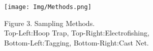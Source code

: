 \documentclass[kappa, margin=1cm, fontscale=0.28]{baposter}
\begin{document}
\begin{poster}
{  \begin{center}
    \texttt{[image: Img/Methods.png]} \\

  \end{center}
  {\small
  Figure 3. Sampling Methods. \\
  Top-Left:Hoop Trap, 
  Top-Right:Electrofishing, \\
  Bottom-Left:Tagging, 
  Bottom-Right:Cast Net.
  }
}
\end{poster}
\end{document}
